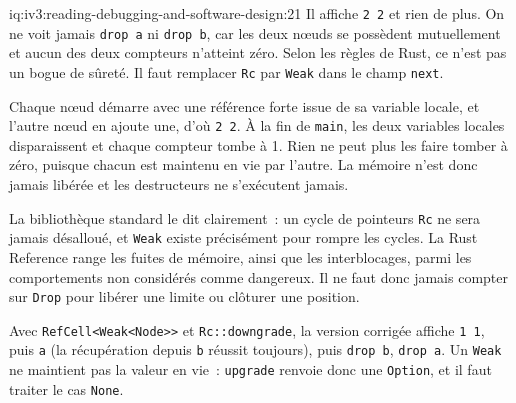 \begin{solution}{iq:iv3:reading-debugging-and-software-design:21}
Il affiche \texttt{2 2} et rien de plus. On ne voit jamais \texttt{drop a} ni \texttt{drop b}, car les deux nœuds se possèdent mutuellement et aucun des deux compteurs n'atteint zéro. Selon les règles de Rust, ce n'est pas un bogue de sûreté. Il faut remplacer \texttt{Rc} par \texttt{Weak} dans le champ \texttt{next}.

Chaque nœud démarre avec une référence forte issue de sa variable locale, et l'autre nœud en ajoute une, d'où \texttt{2 2}. À la fin de \texttt{main}, les deux variables locales disparaissent et chaque compteur tombe à 1. Rien ne peut plus les faire tomber à zéro, puisque chacun est maintenu en vie par l'autre. La mémoire n'est donc jamais libérée et les destructeurs ne s'exécutent jamais.

La bibliothèque standard le dit clairement~: un cycle de pointeurs \texttt{Rc} ne sera jamais désalloué, et \texttt{Weak} existe précisément pour rompre les cycles. La Rust Reference range les fuites de mémoire, ainsi que les interblocages, parmi les comportements non considérés comme dangereux. Il ne faut donc jamais compter sur \texttt{Drop} pour libérer une limite ou clôturer une position.

Avec \texttt{RefCell<Weak<Node>{}>} et \texttt{Rc::downgrade}, la version corrigée affiche \texttt{1 1}, puis \texttt{a} (la récupération depuis \texttt{b} réussit toujours), puis \texttt{drop b}, \texttt{drop a}. Un \texttt{Weak} ne maintient pas la valeur en vie~: \texttt{upgrade} renvoie donc une \texttt{Option}, et il faut traiter le cas \texttt{None}.



\end{solution}

